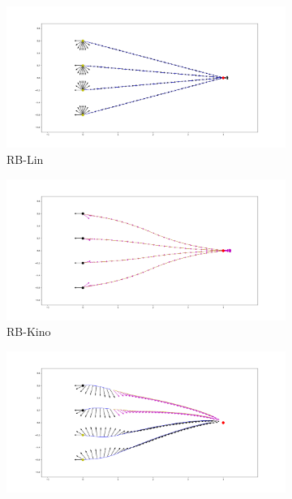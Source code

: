 \begin{figure}[H]
    \captionsetup[subfigure]{justification=centering}
    \centering
    \begin{subfigure}[t]{0.49\linewidth}
    \includegraphics[width=\textwidth]{Figures/Chapter_CPSB/rotation_lin_180_v04.png}
    \caption{RB-Lin}
    \end{subfigure}
    \begin{subfigure}[t]{0.49\linewidth}
    \includegraphics[width=\textwidth]{Figures/Chapter_CPSB/rotation_kino_180_v04.png}
    \caption{RB-Kino}
    \end{subfigure}
    \begin{subfigure}[t]{0.49\linewidth}
    \includegraphics[width=\textwidth]{Figures/Chapter_CPSB/rotation_p1_180_v04.png}

\end{subfigure}
\end{figure}
